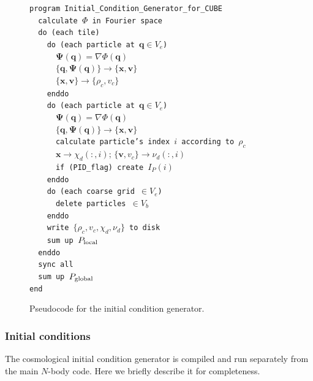 \documentclass[10pt,twocolumn,preprint]{emulateapj}
\newcommand{\bs}{\boldsymbol}
\begin{document}
\begin{figure}[t]
{\tt program Initial\_Condition\_Generator\_for\_CUBE\\
\indent \ \ calculate $\Phi$ in Fourier space\\
\indent \ \ do (each tile)\\
\indent \ \ \ \ do (each particle at ${\bs q}\in V_e$)\\
\indent \ \ \ \ \ \ ${\bs \Psi}({\bs q})=\nabla\Phi({\bs q})$\\
\indent \ \ \ \ \ \ $\{{\bs q},{\bs\Psi({\bs q})}\}\rightarrow\{{\bs x},{\bs v}\}$\\
\indent \ \ \ \ \ \ $\{{\bs x},{\bs v}\}\rightarrow \{\rho_c,v_c\}$\\
\indent \ \ \ \     enddo\\
\indent \ \ \ \ do (each particle at ${\bs q}\in V_e$)\\
\indent \ \ \ \ \ \ ${\bs \Psi}({\bs q})=\nabla\Phi({\bs q})$\\
\indent \ \ \ \ \ \ $\{{\bs q},{\bs\Psi({\bs q})}\}\rightarrow\{{\bs x},{\bs v}\}$\\
\indent \ \ \ \ \ \ calculate particle's index $i$ according to $\rho_c$\\
\indent \ \ \ \ \ \ ${\bs x}\rightarrow\chi_d(:,i);\,\{{\bs v},v_c\}\rightarrow\nu_d(:,i)$\\
\indent \ \ \ \ \ \ if (PID\_flag) create $I_P(i)$\\
\indent \ \ \ \ enddo\\
\indent \ \ \ \ do (each coarse grid $\in V_e$)\\
\indent \ \ \ \ \ \ delete particles $\in V_b$\\
\indent \ \ \ \ enddo\\
\indent \ \ \ \ write $\{\rho_c,v_c,\chi_d,\nu_d\}$ to disk\\
\indent \ \ \ \ sum up $P_{\rm local}$\\
\indent \ \ enddo\\
\indent \ \ sync all\\
\indent \ \ sum up $P_{\rm global}$\\
end\\}
\caption{Pseudocode for the initial condition generator.}
\label{fig.ic}
\end{figure}

\subsubsection{Initial conditions}\label{sss.ic}
The cosmological initial condition generator is compiled and run separately from the main $N$-body code. Here we briefly describe it for completeness.
\end{document}
